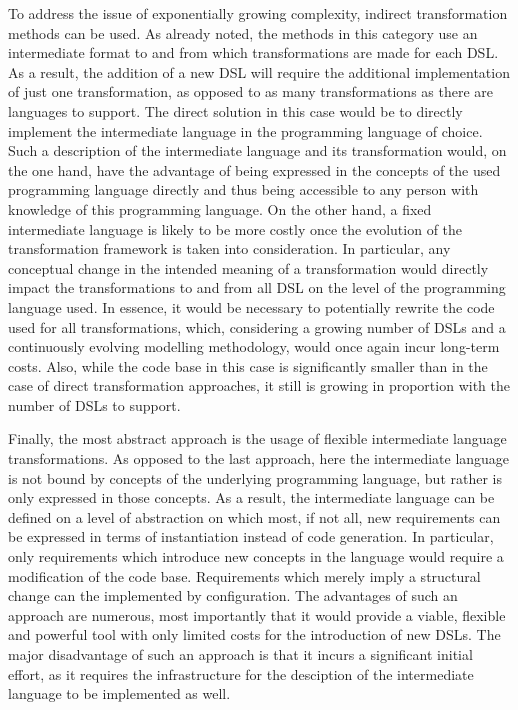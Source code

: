 To address the issue of exponentially growing complexity, indirect transformation methods can be used. As already noted, the methods in this category use an intermediate format to and from which transformations are made for each DSL. As a result, the addition of a new DSL will require the additional implementation of just one transformation, as opposed to as many transformations as there are languages to support. The direct solution in this case would be to directly implement the intermediate language in the programming language of choice. Such a description of the intermediate language and its transformation would, on the one hand, have the advantage of being expressed in the concepts of the used programming language directly and thus being accessible to any person with knowledge of this programming language. On the other hand, a fixed intermediate language is likely to be more costly once the evolution of the transformation framework is taken into consideration. In particular, any conceptual change in the intended meaning of a transformation would directly impact the transformations to and from all DSL on the level of the programming language used. In essence, it would be necessary to potentially rewrite the code used for all transformations, which, considering a growing number of DSLs and a continuously evolving modelling methodology, would once again incur long-term costs. Also, while the code base in this case is significantly smaller than in the case of direct transformation approaches, it still is growing in proportion with the number of DSLs to support.

Finally, the most abstract approach is the usage of flexible intermediate language transformations. As opposed to the last approach, here the intermediate language is not bound by concepts of the underlying programming language, but rather is only expressed in those concepts. As a result, the intermediate language can be defined on a level of abstraction on which most, if not all, new requirements can be expressed in terms of instantiation instead of code generation. In particular, only requirements which introduce new concepts in the language would require a modification of the code base. Requirements which merely imply a structural change can the implemented by configuration. The advantages of such an approach are numerous, most importantly that it would provide a viable, flexible and powerful tool with only limited costs for the introduction of new DSLs. The major disadvantage of such an approach is that it incurs a significant initial effort, as it requires the infrastructure for the desciption of the intermediate language to be implemented as well.

